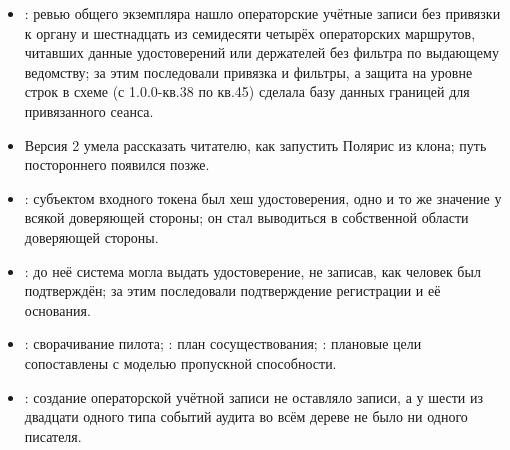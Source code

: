 \begin{itemize}
    запросе со стороны держателя и ничего не связывали, а код авторизации был подписан, но читаем;
     зарегистрировала политику в строке доверяющей стороны.
  \item {}: ревью общего экземпляра нашло операторские учётные записи без привязки к
    органу и шестнадцать из семидесяти четырёх операторских маршрутов, читавших данные
    удостоверений или держателей без фильтра по выдающему ведомству; за этим последовали привязка
    и фильтры, а защита на уровне строк в схеме (с 1.0.0-кв.38 по кв.45) сделала базу данных
    границей для привязанного сеанса.
  \item Версия 2 умела рассказать читателю, как запустить Полярис из клона; путь постороннего
    появился позже.
  \item {}: субъектом входного токена был хеш удостоверения, одно и то же значение у
    всякой доверяющей стороны; он стал выводиться в собственной области доверяющей стороны.
  \item {}: до неё система могла выдать удостоверение, не записав, как человек был
    подтверждён; за этим последовали подтверждение регистрации и её основания.
  \item {}: сворачивание пилота; : план сосуществования; :
    плановые цели сопоставлены с моделью пропускной способности.
  \item {}: создание операторской учётной записи не оставляло записи, а у шести из
    двадцати одного типа событий аудита во всём дереве не было ни одного писателя.
\end{itemize}
